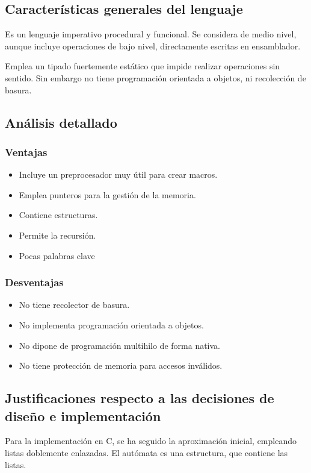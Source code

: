 \documentclass[12pt,a4paper]{article}
\begin{document}
\subsection{Características generales del lenguaje}
Es un lenguaje imperativo procedural y funcional. Se considera de medio nivel,
aunque incluye operaciones de bajo nivel, directamente escritas en ensamblador.

Emplea un tipado fuertemente estático que impide realizar operaciones sin
sentido. Sin embargo no tiene programación orientada a objetos, ni recolección
de basura.
\subsection{Análisis detallado}
\subsubsection{Ventajas}
\begin{itemize}
\item Incluye un preprocesador muy útil para crear macros.
\item Emplea punteros para la gestión de la memoria.
\item Contiene estructuras.
\item Permite la recursión.
\item Pocas palabras clave
\end{itemize}

\subsubsection{Desventajas}
\begin{itemize}
\item No tiene recolector de basura.
\item No implementa programación orientada a objetos.
\item No dipone de programación multihilo de forma nativa.
\item No tiene protección de memoria para accesos inválidos.
\end{itemize}

\subsection{Justificaciones respecto a las decisiones de diseño e implementación}
Para la implementación en C, se ha seguido la aproximación inicial, empleando
listas doblemente enlazadas. El autómata es una estructura, que contiene las
listas.
\end{document}
